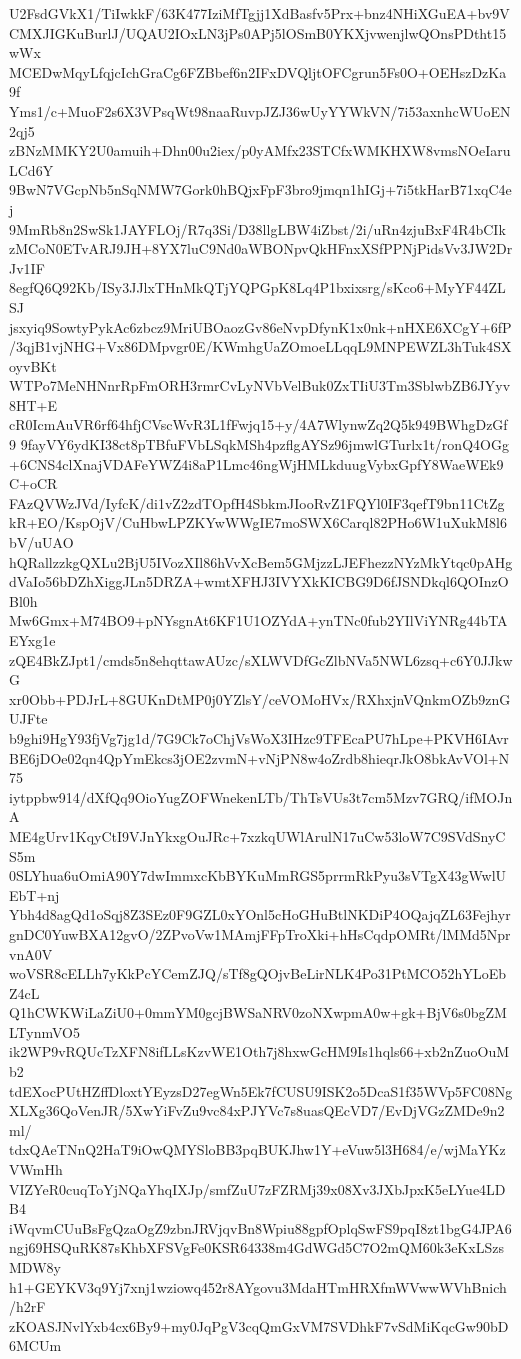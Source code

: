 U2FsdGVkX1/TiIwkkF/63K477IziMfTgjj1XdBasfv5Prx+bnz4NHiXGuEA+bv9V
CMXJIGKuBurlJ/UQAU2IOxLN3jPs0APj5lOSmB0YKXjvwenjlwQOnsPDtht15wWx
MCEDwMqyLfqjcIchGraCg6FZBbef6n2IFxDVQljtOFCgrun5Fs0O+OEHszDzKa9f
Yms1/c+MuoF2s6X3VPsqWt98naaRuvpJZJ36wUyYYWkVN/7i53axnhcWUoEN2qj5
zBNzMMKY2U0amuih+Dhn00u2iex/p0yAMfx23STCfxWMKHXW8vmsNOeIaruLCd6Y
9BwN7VGcpNb5nSqNMW7Gork0hBQjxFpF3bro9jmqn1hIGj+7i5tkHarB71xqC4ej
9MmRb8n2SwSk1JAYFLOj/R7q3Si/D38llgLBW4iZbst/2i/uRn4zjuBxF4R4bCIk
zMCoN0ETvARJ9JH+8YX7luC9Nd0aWBONpvQkHFnxXSfPPNjPidsVv3JW2DrJv1IF
8egfQ6Q92Kb/ISy3JJlxTHnMkQTjYQPGpK8Lq4P1bxixsrg/sKco6+MyYF44ZLSJ
jsxyiq9SowtyPykAc6zbcz9MriUBOaozGv86eNvpDfynK1x0nk+nHXE6XCgY+6fP
/3qjB1vjNHG+Vx86DMpvgr0E/KWmhgUaZOmoeLLqqL9MNPEWZL3hTuk4SXoyvBKt
WTPo7MeNHNnrRpFmORH3rmrCvLyNVbVelBuk0ZxTIiU3Tm3SblwbZB6JYyv8HT+E
cR0IcmAuVR6rf64hfjCVscWvR3L1fFwjq15+y/4A7WlynwZq2Q5k949BWhgDzGf9
9fayVY6ydKI38ct8pTBfuFVbLSqkMSh4pzflgAYSz96jmwlGTurlx1t/ronQ4OGg
+6CNS4clXnajVDAFeYWZ4i8aP1Lmc46ngWjHMLkduugVybxGpfY8WaeWEk9C+oCR
FAzQVWzJVd/IyfcK/di1vZ2zdTOpfH4SbkmJIooRvZ1FQYl0IF3qefT9bn11CtZg
kR+EO/KspOjV/CuHbwLPZKYwWWgIE7moSWX6Carql82PHo6W1uXukM8l6bV/uUAO
hQRallzzkgQXLu2BjU5IVozXIl86hVvXcBem5GMjzzLJEFhezzNYzMkYtqc0pAHg
dVaIo56bDZhXiggJLn5DRZA+wmtXFHJ3IVYXkKICBG9D6fJSNDkql6QOInzOBl0h
Mw6Gmx+M74BO9+pNYsgnAt6KF1U1OZYdA+ynTNc0fub2YIlViYNRg44bTAEYxg1e
zQE4BkZJpt1/cmds5n8ehqttawAUzc/sXLWVDfGcZlbNVa5NWL6zsq+c6Y0JJkwG
xr0Obb+PDJrL+8GUKnDtMP0j0YZlsY/ceVOMoHVx/RXhxjnVQnkmOZb9znGUJFte
b9ghi9HgY93fjVg7jg1d/7G9Ck7oChjVsWoX3IHzc9TFEcaPU7hLpe+PKVH6IAvr
BE6jDOe02qn4QpYmEkcs3jOE2zvmN+vNjPN8w4oZrdb8hieqrJkO8bkAvVOl+N75
iytppbw914/dXfQq9OioYugZOFWnekenLTb/ThTsVUs3t7cm5Mzv7GRQ/ifMOJnA
ME4gUrv1KqyCtI9VJnYkxgOuJRc+7xzkqUWlArulN17uCw53loW7C9SVdSnyCS5m
0SLYhua6uOmiA90Y7dwImmxcKbBYKuMmRGS5prrmRkPyu3sVTgX43gWwlUEbT+nj
Ybh4d8agQd1oSqj8Z3SEz0F9GZL0xYOnl5cHoGHuBtlNKDiP4OQajqZL63Fejhyr
gnDC0YuwBXA12gvO/2ZPvoVw1MAmjFFpTroXki+hHsCqdpOMRt/lMMd5NprvnA0V
woVSR8cELLh7yKkPcYCemZJQ/sTf8gQOjvBeLirNLK4Po31PtMCO52hYLoEbZ4cL
Q1hCWKWiLaZiU0+0mmYM0gcjBWSaNRV0zoNXwpmA0w+gk+BjV6s0bgZMLTynmVO5
ik2WP9vRQUcTzXFN8ifLLsKzvWE1Oth7j8hxwGcHM9Is1hqls66+xb2nZuoOuMb2
tdEXocPUtHZffDloxtYEyzsD27egWn5Ek7fCUSU9ISK2o5DcaS1f35WVp5FC08Ng
XLXg36QoVenJR/5XwYiFvZu9vc84xPJYVc7s8uasQEcVD7/EvDjVGzZMDe9n2ml/
tdxQAeTNnQ2HaT9iOwQMYSloBB3pqBUKJhw1Y+eVuw5l3H684/e/wjMaYKzVWmHh
VIZYeR0cuqToYjNQaYhqIXJp/smfZuU7zFZRMj39x08Xv3JXbJpxK5eLYue4LDB4
iWqvmCUuBsFgQzaOgZ9zbnJRVjqvBn8Wpiu88gpfOplqSwFS9pqI8zt1bgG4JPA6
ngj69HSQuRK87sKhbXFSVgFe0KSR64338m4GdWGd5C7O2mQM60k3eKxLSzsMDW8y
h1+GEYKV3q9Yj7xnj1wziowq452r8AYgovu3MdaHTmHRXfmWVwwWVhBnich/h2rF
zKOASJNvlYxb4cx6By9+my0JqPgV3cqQmGxVM7SVDhkF7vSdMiKqcGw90bD6MCUm
